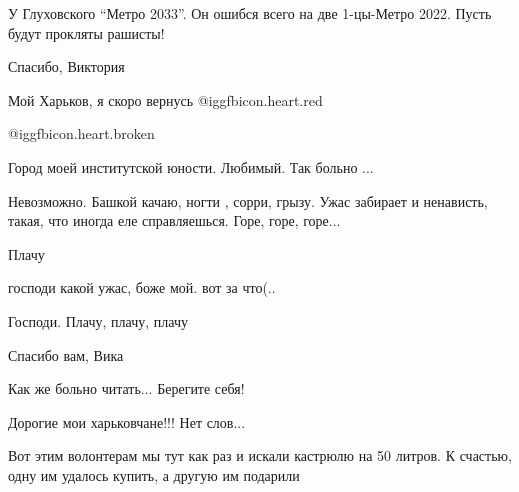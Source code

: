 \begin{itemize}
У Глуховского \enquote{Метро 2033}. Он ошибся всего на две 1-цы-Метро 2022. Пусть будут прокляты рашисты!

Спасибо, Виктория

Мой Харьков, я скоро вернусь @igg{fbicon.heart.red}

 @igg{fbicon.heart.broken} 

Город моей институтской юности. Любимый.
Так больно ...


Невозможно. Башкой качаю, ногти , сорри, грызу. Ужас забирает и ненависть,
такая, что иногда еле справляешься. Горе, горе, горе...

Плачу

господи какой ужас, боже мой. вот за что(..

Господи. Плачу, плачу, плачу

Спасибо вам, Вика

Как же больно читать... Берегите себя!

Дорогие мои харьковчане!!! Нет слов...


Вот этим волонтерам мы тут как раз и искали кастрюлю на 50 литров. К счастью,
одну им удалось купить, а другую им подарили

\end{itemize} %
